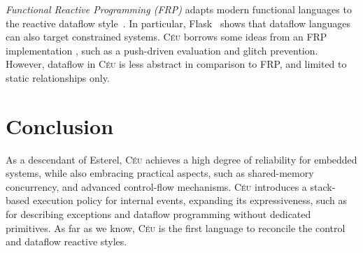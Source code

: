 \documentclass{acm_proc_article-sp}
\newcommand{\CEU}{\textsc{C\'{e}u}\xspace}
\newcommand{\code}[1] {{\small{\texttt{#1}}}}
\newcommand{\1}{\;}
\newcommand{\2}{\;\;}
\newcommand{\3}{\;\;\;}
\newcommand{\5}{\;\;\;\;\;}
\begin{document}
\emph{Functional Reactive Programming (FRP)} adapts modern functional languages 
to the reactive dataflow style~\cite{frp.principles}.
In particular, Flask~\cite{wsn.flask} shows that dataflow languages can also 
target constrained systems.
%
\CEU borrows some ideas from an FRP implementation \cite{frtime.embedding}, 
such as a push-driven evaluation and glitch prevention.
However, dataflow in \CEU is less abstract in comparison to FRP, and limited to 
static relationships only.

\section{Conclusion}
\label{sec.conclusion}

As a descendant of Esterel, \CEU achieves a high degree of reliability for 
embedded systems, while also embracing practical aspects, such as
shared-memory concurrency, and advanced control-flow mechanisms.
%
\CEU introduces a stack-based execution policy for internal events, expanding 
its expressiveness, such as for describing exceptions and dataflow programming 
without dedicated primitives.
%
As far as we know, \CEU is the first language to reconcile the control and 
dataflow reactive styles.
%
\end{document}

